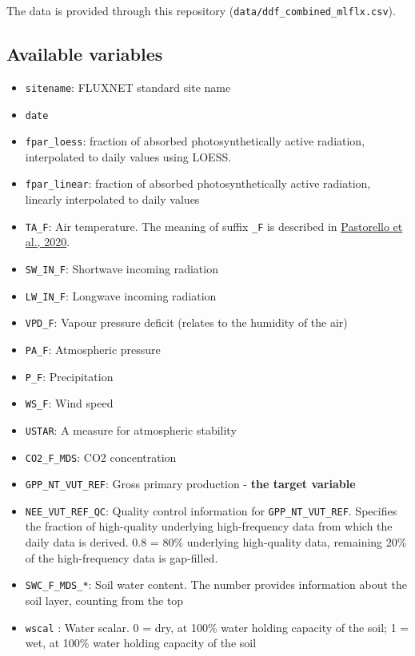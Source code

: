 \documentclass[
]{book}
\providecommand{\tightlist}{%
  \setlength{\itemsep}{0pt}\setlength{\parskip}{0pt}}
\begin{document}
The data is provided through this repository (\texttt{data/ddf\_combined\_mlflx.csv}).

\hypertarget{available-variables}{%
\subsection{Available variables}\label{available-variables}}

\begin{itemize}
\tightlist
\item
  \texttt{sitename}: FLUXNET standard site name
\item
  \texttt{date}
\item
  \texttt{fpar\_loess}: fraction of absorbed photosynthetically active radiation, interpolated to daily values using LOESS.
\item
  \texttt{fpar\_linear}: fraction of absorbed photosynthetically active radiation, linearly interpolated to daily values
\item
  \texttt{TA\_F}: Air temperature. The meaning of suffix \texttt{\_F} is described in \href{https://www.nature.com/articles/s41597-020-0534-3}{Pastorello et al., 2020}.
\item
  \texttt{SW\_IN\_F}: Shortwave incoming radiation
\item
  \texttt{LW\_IN\_F}: Longwave incoming radiation
\item
  \texttt{VPD\_F}: Vapour pressure deficit (relates to the humidity of the air)
\item
  \texttt{PA\_F}: Atmospheric pressure
\item
  \texttt{P\_F}: Precipitation
\item
  \texttt{WS\_F}: Wind speed
\item
  \texttt{USTAR}: A measure for atmospheric stability
\item
  \texttt{CO2\_F\_MDS}: CO2 concentration
\item
  \texttt{GPP\_NT\_VUT\_REF}: Gross primary production - \textbf{the target variable}
\item
  \texttt{NEE\_VUT\_REF\_QC}: Quality control information for \texttt{GPP\_NT\_VUT\_REF}. Specifies the fraction of high-quality underlying high-frequency data from which the daily data is derived. 0.8 = 80\% underlying high-quality data, remaining 20\% of the high-frequency data is gap-filled.
\item
  \texttt{SWC\_F\_MDS\_*}: Soil water content. The number provides information about the soil layer, counting from the top
\item
  \texttt{wscal} : Water scalar. 0 = dry, at 100\% water holding capacity of the soil; 1 = wet, at 100\% water holding capacity of the soil
\end{itemize}
\end{document}
